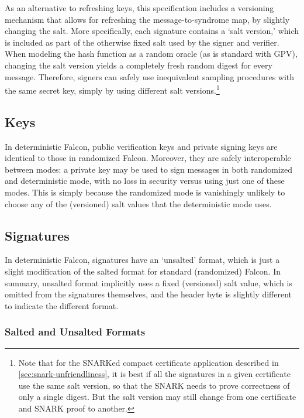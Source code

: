 \documentclass[11pt]{article}
\begin{document}
As an alternative to refreshing keys, this specification includes a
versioning mechanism that allows for refreshing the
message-to-syndrome map, by slightly changing the salt. More
specifically, each signature contains a `salt version,' which is
included as part of the otherwise fixed salt used by the signer and
verifier. When modeling the hash function as a random oracle (as is
standard with GPV), changing the salt version yields a completely
fresh random digest for every message. Therefore, signers can safely
use inequivalent sampling procedures with the same secret key, simply
by using different salt versions.\footnote{Note that for the SNARKed
  compact certificate application described in
  \cref{sec:snark-unfriendliness}, it is best if all the signatures in
  a given certificate use the same salt version, so that the SNARK
  needs to prove correctness of only a single digest. But the salt
  version may still change from one certificate and SNARK proof to
  another.}

\subsection{Keys}
\label{sec:keys}

In deterministic Falcon, public verification keys and private signing
keys are identical to those in randomized Falcon. Moreover, they
are safely interoperable between modes: a private key may be used to
sign messages in both randomized and deterministic mode, with no loss
in security versus using just one of these modes. This is simply
because the randomized mode is vanishingly unlikely to choose any of
the (versioned) salt values that the deterministic mode uses.

\subsection{Signatures}
\label{sec:signatures}

In deterministic Falcon, signatures have an `unsalted' format, which
is just a slight modification of the salted format for standard
(randomized) Falcon. In summary, unsalted format implicitly uses a
fixed (versioned) salt value, which is omitted from the signatures
themselves, and the header byte is slightly different to indicate the
different format.

\subsubsection{Salted and Unsalted Formats}
\label{sec:formats}
\end{document}
